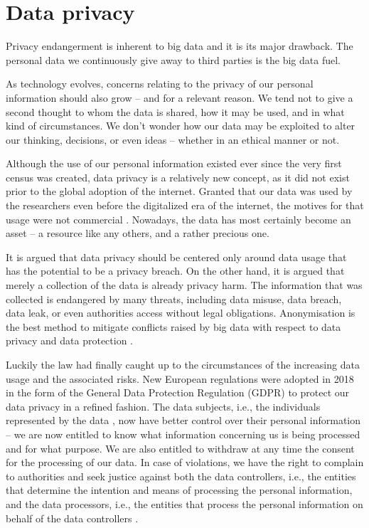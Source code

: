 \documentclass[a4paper,twoside,12pt]{book}
\begin{document}
\section{Data privacy}

Privacy endangerment is inherent to big data and it is its major drawback. The personal data we continuously give away to third parties is the big data fuel.

As technology evolves, concerns relating to the privacy of our personal information should also grow – and for a relevant reason.  We tend not to give a second thought to whom the data is shared, how it may be used, and in what kind of circumstances. We don't wonder how our data may be exploited to alter our thinking, decisions, or even ideas – whether in an ethical manner or not. 

Although the use of our personal information existed ever since the very first census was created, data privacy is a relatively new concept, as it did not exist prior to the global adoption of the internet. Granted that our data was used by the researchers even before the digitalized era of the internet, the motives for that usage were not commercial \cite{bib:gdpr_handbook}. Nowadays, the data has most certainly become an asset – a resource like any others, and a rather precious one.

It is argued that data privacy should be centered only around data usage that has the potential to be a privacy breach. On the other hand, it is argued that merely a collection of the data is already privacy harm. The information that was collected is endangered by many threats, including data misuse, data breach, data leak, or even authorities access without legal obligations. Anonymisation is the best method to mitigate conflicts raised by big data with respect to data privacy and data protection \cite{bib:big_data_privacy}.

Luckily the law had finally caught up to the circumstances of the increasing data usage and the associated risks. New European regulations were adopted in 2018 in the form of the General Data Protection Regulation (GDPR) to protect our data privacy in a refined fashion. The data subjects, i.e., the individuals represented by the data \cite{bib:anonymization_pipeline}, now have better control over their personal information – we are now entitled to know what information concerning us is being  processed and for what purpose. We are also entitled to withdraw at any time the consent for the processing of our data. In case of violations, we have the right to complain to authorities and seek justice against both the data controllers, i.e., the entities that determine the intention and means of processing the personal information, and the data processors, i.e., the entities that process the personal information on behalf of the data controllers \cite{bib:gdpr_compliance}.
\end{document}
